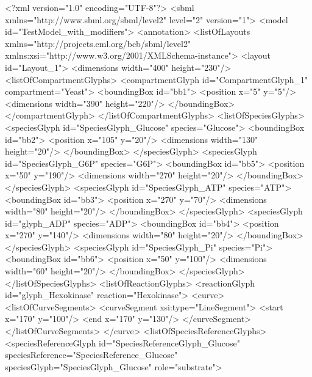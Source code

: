 \begin{example}
<?xml version="1.0" encoding="UTF-8"?>
<sbml xmlns="http://www.sbml.org/sbml/level2" level="2" version="1">
  <model id="TestModel_with_modifiers">
    <annotation>
     <listOfLayouts xmlns="http://projects.eml.org/bcb/sbml/level2"
              xmlns:xsi="http://www.w3.org/2001/XMLSchema-instance">
      <layout id="Layout_1">
        <dimensions width="400" height="230"/>
        <listOfCompartmentGlyphs>
          <compartmentGlyph id="CompartmentGlyph_1" compartment="Yeast">
            <boundingBox id="bb1">
              <position x="5" y="5"/>
              <dimensions width="390" height="220"/>
            </boundingBox>
          </compartmentGlyph>
        </listOfCompartmentGlyphs>
        <listOfSpeciesGlyphs>
          <speciesGlyph id="SpeciesGlyph_Glucose" species="Glucose">
            <boundingBox id="bb2">
              <position x="105" y="20"/>
              <dimensions width="130" height="20"/>
            </boundingBox>
          </speciesGlyph>
          <speciesGlyph id="SpeciesGlyph_G6P" species="G6P">
            <boundingBox id="bb5">
              <position x="50" y="190"/>
              <dimensions width="270" height="20"/>
            </boundingBox>
          </speciesGlyph>
          <speciesGlyph id="SpeciesGlyph_ATP" species="ATP">
            <boundingBox id="bb3">
              <position x="270" y="70"/>
              <dimensions width="80" height="20"/>
            </boundingBox>
          </speciesGlyph>
          <speciesGlyph id="glyph_ADP" species="ADP">
            <boundingBox id="bb4">
              <position x="270" y="140"/>
              <dimensions width="80" height="20"/>
            </boundingBox>
          </speciesGlyph>
          <speciesGlyph id="SpeciesGlyph_Pi" species="Pi">
            <boundingBox id="bb6">
              <position x="50" y="100"/>
              <dimensions width="60" height="20"/>
            </boundingBox>
          </speciesGlyph>
        </listOfSpeciesGlyphs>
        <listOfReactionGlyphs>
          <reactionGlyph id="glyph_Hexokinase" reaction="Hexokinase">
            <curve>
              <listOfCurveSegments>
                <curveSegment xsi:type="LineSegment">
                  <start x="170" y="100"/>
                  <end x="170" y="130"/>
                </curveSegment>
              </listOfCurveSegments>
            </curve>
            <listOfSpeciesReferenceGlyphs>
              <speciesReferenceGlyph id="SpeciesReferenceGlyph_Glucose"
                            speciesReference="SpeciesReference_Glucose"
                            speciesGlyph="SpeciesGlyph_Glucose" role="substrate">

\end{example}
